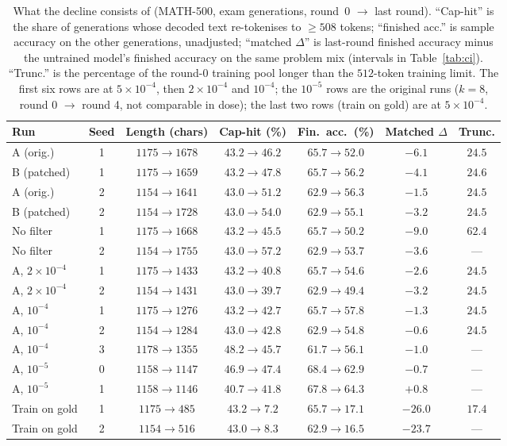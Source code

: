 \documentclass[runningheads]{llncs}
\begin{document}
\begin{table}[t]
\caption{What the decline consists of (MATH-500, exam generations, round~0
$\to$ last round). ``Cap-hit'' is the share of generations whose decoded text
re-tokenises to $\ge508$ tokens; ``finished acc.'' is sample accuracy on the
other generations, unadjusted; ``matched $\Delta$'' is last-round finished
accuracy minus the untrained model's finished accuracy on the same problem mix
(intervals in Table~\ref{tab:ci}). ``Trunc.'' is the percentage of the round-0
training pool longer than the $512$-token training limit. The first six rows
are at $5\times10^{-4}$, then $2\times10^{-4}$ and $10^{-4}$; the $10^{-5}$ rows
are the original runs ($k=8$, round 0 $\to$ round 4, not comparable in dose); the
last two rows (train on gold) are at $5\times10^{-4}$.}
\label{tab:anatomy}
\centering
\footnotesize
\setlength{\tabcolsep}{2.5pt}
\begin{tabular}{lcccccc}
\toprule
Run & Seed & Length (chars) & Cap-hit (\%) & Fin.\ acc.\ (\%) & Matched $\Delta$ & Trunc. \\
\midrule
A (orig.) & 1 & $1175\to1678$ & $43.2\to46.2$ & $65.7\to52.0$ & $-6.1$ & $24.5$ \\
B (patched) & 1 & $1175\to1659$ & $43.2\to47.8$ & $65.7\to56.2$ & $-4.1$ & $24.6$ \\
A (orig.) & 2 & $1154\to1641$ & $43.0\to51.2$ & $62.9\to56.3$ & $-1.5$ & $24.5$ \\
B (patched) & 2 & $1154\to1728$ & $43.0\to54.0$ & $62.9\to55.1$ & $-3.2$ & $24.5$ \\
No filter & 1 & $1175\to1668$ & $43.2\to45.5$ & $65.7\to50.2$ & $-9.0$ & $62.4$ \\
No filter & 2 & $1154\to1755$ & $43.0\to57.2$ & $62.9\to53.7$ & $-3.6$ & --- \\
A, $2\times10^{-4}$ & 1 & $1175\to1433$ & $43.2\to40.8$ & $65.7\to54.6$ & $-2.6$ & $24.5$ \\
A, $2\times10^{-4}$ & 2 & $1154\to1431$ & $43.0\to39.7$ & $62.9\to49.4$ & $-3.2$ & $24.5$ \\
A, $10^{-4}$ & 1 & $1175\to1276$ & $43.2\to42.7$ & $65.7\to57.8$ & $-1.3$ & $24.5$ \\
A, $10^{-4}$ & 2 & $1154\to1284$ & $43.0\to42.8$ & $62.9\to54.8$ & $-0.6$ & $24.5$ \\
A, $10^{-4}$ & 3 & $1178\to1355$ & $48.2\to45.7$ & $61.7\to56.1$ & $-1.0$ & --- \\
A, $10^{-5}$ & 0 & $1158\to1147$ & $46.9\to47.4$ & $68.4\to62.9$ & $-0.7$ & --- \\
A, $10^{-5}$ & 1 & $1158\to1146$ & $40.7\to41.8$ & $67.8\to64.3$ & $+0.8$ & --- \\
Train on gold & 1 & $1175\to485$ & $43.2\to7.2$ & $65.7\to17.1$ & $-26.0$ & $17.4$ \\
Train on gold & 2 & $1154\to516$ & $43.0\to8.3$ & $62.9\to16.5$ & $-23.7$ & --- \\
\bottomrule
\end{tabular}
\end{table}
\end{document}
